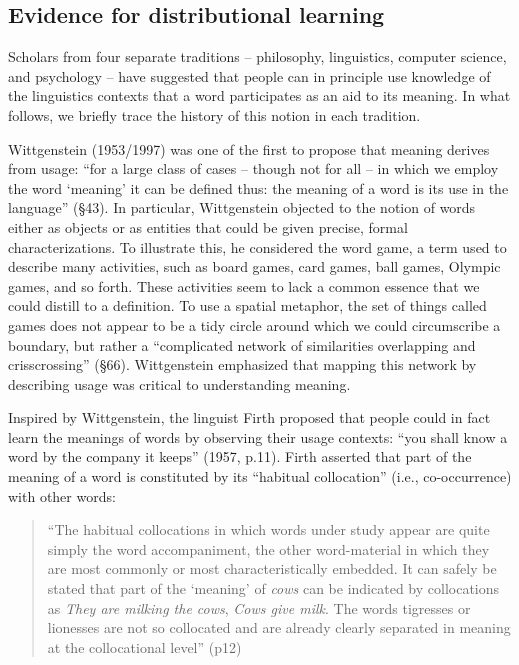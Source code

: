 \documentclass[man,floatsintext]{apa6}
\begin{document}
\subsection{Evidence for distributional learning}

Scholars from four separate traditions -- philosophy, linguistics, computer science, and psychology -- have suggested that people can in principle use knowledge of the linguistics contexts that a word participates as an aid to its meaning. In what follows, we briefly trace the history of this notion in each tradition.

Wittgenstein (1953/1997) was one of the first to propose that meaning derives from usage: ``for a large class of cases -- though not for all -- in which we employ the word `meaning' it can be defined thus: the meaning of a word is its use in the language'' (\S 43). In particular, Wittgenstein objected to the notion of words either as objects or as entities that could be given precise, formal characterizations. To illustrate this, he considered the word game, a term used to describe many activities, such as board games, card games, ball games, Olympic games, and so forth. These activities seem to lack a common essence that we could distill to a definition. To use a spatial metaphor, the set of things called games does not appear to be a tidy circle around which we could circumscribe a boundary, but rather a ``complicated network of similarities overlapping and crisscrossing'' (\S 66). Wittgenstein emphasized that mapping this network by describing usage was critical to understanding meaning.

Inspired by Wittgenstein, the linguist Firth proposed that people could in fact learn the meanings of words by observing their usage contexts: ``you shall know a word by the company it keeps'' (1957, p.11). Firth asserted that part of the meaning of a word is constituted by its ``habitual collocation'' (i.e., co-occurrence) with other words:

\begin{quote}
  ``The habitual collocations in which words under study appear are quite simply the word accompaniment, the other word-material in which they are most commonly or most characteristically embedded. It can safely be stated that part of the `meaning' of \emph{cows} can be indicated by collocations as \emph{They are milking the cows}, \emph{Cows give milk}. The words tigresses or lionesses are not so collocated and are already clearly separated in meaning at the collocational level'' (p12)
\end{quote}
\end{document}
